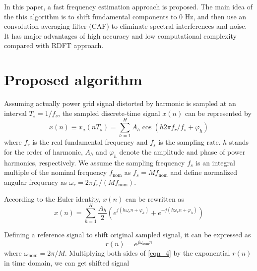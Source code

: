 \documentclass[journal,twoside]{IEEEtran}
\begin{document}
 In this paper, a fast frequency estimation approach is proposed. 
 The main idea of the this algorithm is to shift fundamental components to 0 Hz, and then use an convolution averaging filter (CAF) to eliminate spectral interferences and noise. It has major advantages of high accuracy and low computational complexity compared with RDFT approach. 


\section{Proposed  algorithm}
Assuming  actually power grid signal distorted by harmonic is sampled at  an interval $T_s=1/f_s$,  the sampled discrete-time signal $x(n)$ can be represented by
\begin{equation}
x(n)\equiv x_a(nT_s)=\sum_{h=1}^{H}A_h\cos (h2\pi f_r/f_s+\varphi_h)\label{eqn_3}
\end{equation}
where $f_r$ is the real fundamental frequency and $f_s$ is the sampling rate. $h$ stands for the order of harmonic, $A_h$ and $\varphi_h$ denote the amplitude and phase of power harmonics, respectively.
We assume the sampling frequency $f_s$ is an integral multiple of the nominal frequency $f_\mathrm{nom}$ as $f_s=Mf_\mathrm{nom}$ and define normalized angular frequency as  $\omega_r=2\pi f_r/(Mf_\mathrm{nom})$. 

According to the Euler identity, $x(n)$ can be rewritten as
\begin{equation}
x(n)=\sum_{h=1}^{H}\dfrac{A_h}{2}\left(e^{j\left(h\omega_r n+\varphi_h\right)}+e^{-j\left(h\omega_r n+\varphi_h\right)}\right)\label{eqn_4}
\end{equation}



Defining a reference signal to shift original sampled signal, it can be expressed as 
\begin{equation}
r(n)=e^{j\omega_\mathrm{nom}n}\label{eqn_yao}
\end{equation}
where $\omega_\mathrm{nom}=2\pi /M$.  
Multiplying both sides of \eqref{eqn_4} by the exponential $r(n)$ in time domain, we can get shifted signal
\end{document}
